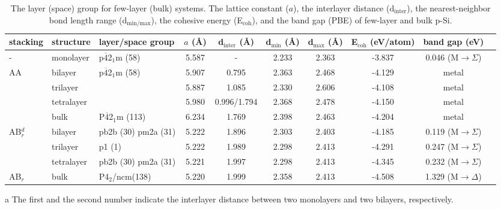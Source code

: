 \begin{landscape}
\begin{table}[htb]
\centering
\begin{threeparttable}[b]
\caption{The layer (space) group for few-layer (bulk) systems. The lattice constant ($a$), the interlayer distance (d$_{\text{inter}}$), the nearest-neighbor bond length range (d$_{\text{min/max}}$), the cohesive energy (E$_{\text{coh}}$), and the band gap (PBE) of few-layer and bulk p-Si.}
\label{few-layer-table}
\begin{footnotesize}
\begin{tabular}{ll|lccccccc}
\hline\hline
stacking & structure & layer/space group & $a$ (\AA) & d$_{\text{inter}}$ (\AA) & d$_{\text{min}}$ (\AA) & d$_{\text{max}}$ (\AA) & E$_{\text{coh}}$ (eV/atom) & band gap (eV)   &  \\[3pt]  \hline
-& monolayer & p$\overline{4}$2$_1$m (58) & 5.587  & - & 2.233 & 2.363 & -3.837 &  0.046 (M$\rightarrow \Sigma$) & \\[3pt] \hline
\multirow{4}{*}{AA}
& bilayer    & \multirow{3}{*}{p$\overline{4}$2$_1$m (58)} & 5.907  & 0.795 & 2.363 & 2.468 & -4.129 & metal  &  \\[3pt]
& trilayer   &   &5.887   & 1.085    & 2.330 & 2.606 & -4.108           & metal          &  \\[3pt]
& tetralayer &   & 5.980  & 0.996/1.794\tnote{a}   & 2.368 &	2.478   & -4.150           & metal          &  \\[3pt]
& bulk       & P$\overline{4}$2$_1$m (113)  & 6.234  & 1.769    & 2.398 & 2.463          & -4.204            & metal           &  \\[3pt] \hline
\multirow{3}{*}{AB$_r^d$}                          
& bilayer   & pb2b (30) pm2a (31) & 5.222            & 1.896      &2.303 &	2.403         & -4.185           & 0.119 (M$\rightarrow \Sigma$) &  \\[3pt]
& trilayer  & p1 (1) & 5.222            & 1.989     & 2.298 &	2.413           & -4.291           & 0.247 (M$\rightarrow \Sigma$) &  \\[3pt]
& tetralayer & pb2b (30) pm2a (31) & 5.221            & 1.997       & 2.298	 & 2.413         & -4.345           & 0.232 (M$\rightarrow \Sigma$) &  \\[3pt]
AB$_r$ & bulk      & P4$_2$/ncm(138) & 5.220         & 1.999       & 2.358 &	2.413         & -4.508           & 1.329 (M$\rightarrow \Delta$) & \\ \hline\hline
\end{tabular}
\end{footnotesize}
\begin{tablenotes}
\item [a]The first and the second number indicate the interlayer distance between two monolayers and two bilayers, respectively.
\end{tablenotes}
\end{threeparttable}
\end{table}
\end{landscape}

